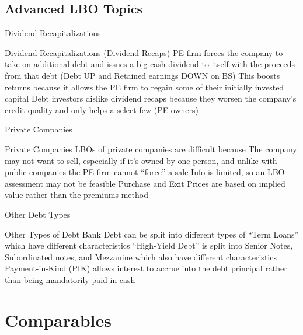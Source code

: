 \documentclass[10pt]{article}
\begin{document}
  \subsection{Advanced LBO Topics}

    \begin{core}{Dividend Recapitalizations}

      Dividend Recapitalizations (Dividend Recaps)
      PE firm forces the company to take on additional debt and issues a big cash dividend to itself with the proceeds from that debt (Debt UP and Retained earnings DOWN on BS)
      This boosts returns because it allows the PE firm to regain some of their initially invested capital
      Debt investors dislike dividend recaps because they worsen the company’s credit quality and only helps a select few (PE owners)

    \end{core}

    \begin{core}{Private Companies}

      Private Companies
      LBOs of private companies are difficult because
      The company may not want to sell, especially if it’s owned by one person, and unlike with public companies the PE firm cannot “force” a sale
      Info is limited, so an LBO assessment may not be feasible
      Purchase and Exit Prices are based on implied value rather than the premiums method

    \end{core}

    \begin{core}{Other Debt Types}

      Other Types of Debt
      Bank Debt can be split into different types of “Term Loans” which have different characteristics
      “High-Yield Debt” is split into Senior Notes, Subordinated notes, and Mezzanine which also have different characteristics
      Payment-in-Kind (PIK) allows interest to accrue into the debt principal rather than being mandatorily paid in cash

    \end{core}

\section{Comparables}
\end{document}
